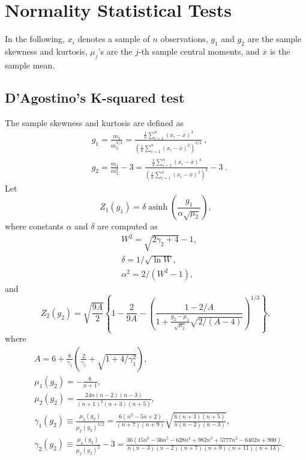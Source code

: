 \section{Normality Statistical Tests}\label{sec:statisticaltest}
    In the following, $x_i$ denotes a sample of $n$ observations, $g_1$ and $g_2$ are the sample 
    skewness and kurtosis, $\mu_j$'s are the $j$-th sample central moments, and $\overline{x}$ is the 
    sample mean. 
    \subsection{D'Agostino's K-squared test}
        The sample skewness and kurtosis are defined as
        \begin{align}
            & g_1 = \frac{ m_3 }{ m_2^{3/2} } = \frac{\frac{1}{n} \sum_{i=1}^n \left( x_i - \overline{x} \right)^3}{\left( \frac{1}{n} \sum_{i=1}^n \left( x_i - \overline{x} \right)^2 \right)^{3/2}}\ , \\
            & g_2 = \frac{ m_4 }{ m_2^{2} }-3 = \frac{\frac{1}{n} \sum_{i=1}^n \left( x_i - \overline{x} \right)^4}{\left( \frac{1}{n} \sum_{i=1}^n \left( x_i - \overline{x} \right)^2 \right)^2} - 3\ .
        \end{align}
        Let
        \begin{equation}
            Z_1(g_1) = \delta \operatorname{asinh}\left( \frac{g_1}{\alpha\sqrt{\mu_2}} \right),
        \end{equation}
        where constants $\alpha$ and $\delta$ are computed as
        \begin{align}
            & W^2 = \sqrt{2\gamma_2 + 4} - 1, \\
            & \delta = 1 / \sqrt{\ln W}, \\
            & \alpha^2 = 2 / (W^2-1),
        \end{align}
        and
        \begin{equation}
            Z_2(g_2) = \sqrt{\frac{9A}{2}} \left\{1 - \frac{2}{9A} - \left(\frac{ 1-2/A }{ 1+\frac{g_2-\mu_1}{\sqrt{\mu_2}}\sqrt{2/(A-4)} }\right)^{\!1/3}\right\},  
        \end{equation}
        where
        \begin{align}
            & A = 6 + \frac{8}{\gamma_1} \left( \frac{2}{\gamma_1} + \sqrt{1+4/\gamma_1^2}\right), \\
            & \mu_1(g_2) = - \frac{6}{n+1}, \\
            & \mu_2(g_2) = \frac{ 24n(n-2)(n-3) }{ (n+1)^2(n+3)(n+5) }, \\
            & \gamma_1(g_2) \equiv \frac{\mu_3(g_2)}{\mu_2(g_2)^{3/2}} = \frac{6(n^2-5n+2)}{(n+7)(n+9)} \sqrt{\frac{6(n+3)(n+5)}{n(n-2)(n-3)}},  \label{eq:gamma1}\\
            & \gamma_2(g_2) \equiv \frac{\mu_4(g_2)}{\mu_2(g_2)^{2}}-3 = \frac{ 36(15n^6-36n^5-628n^4+982n^3+5777n^2-6402n+900) }{ n(n-3)(n-2)(n+7)(n+9)(n+11)(n+13) }\label{eq:gamma2}.
        \end{align}
